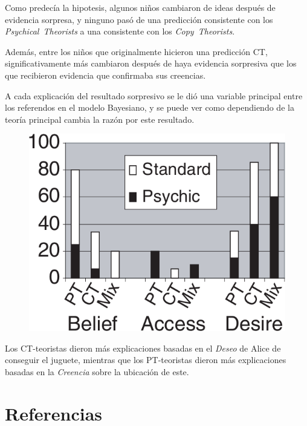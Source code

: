 \documentclass{beamer}
\begin{document}
\begin{frame}
Como predecía la hipotesis, algunos niños cambiaron de ideas después de evidencia sorpresa, y ninguno pasó de una predicción consistente con los \textit{Psychical~Theorists} a una consistente con los \textit{Copy~Theorists}.

Además, entre los niños que originalmente hicieron una predicción CT, significativamente más cambiaron después de haya evidencia sorpresiva que los que recibieron evidencia que confirmaba sus creencias.

\end{frame}

\begin{frame}
A cada explicación del resultado sorpresivo se le dió una variable principal entre los referendos en el modelo Bayesiano, y se puede ver como dependiendo de la teoría principal cambia la razón por este resultado.

\begin{figure}
\includegraphics[height=.45\textheight]{imagenes/resultados_belief.png}
\end{figure}

\vspace{-1em}

Los CT-teoristas dieron más explicaciones basadas en el \textit{Deseo} de Alice de conseguir el juguete, mientras que los PT-teoristas dieron más explicaciones basadas en la \textit{Creencia} sobre la ubicación de este.
\end{frame}

\section{Referencias}
\end{document}
